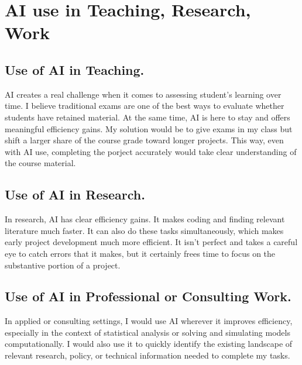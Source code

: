 \documentclass[11pt]{article}
\begin{document}
\section{\large AI use in Teaching, Research, Work}

\subsection{Use of AI in Teaching.}

\par AI creates a real challenge when it comes to assessing student's learning over time. I believe traditional exams are one of the best ways to evaluate whether students have retained material. At the same time, AI is here to stay and offers meaningful efficiency gains. My solution would be to give exams in my class but shift a larger share of the course grade toward longer projects. This way, even with AI use, completing the porject accurately would take clear understanding of the course material.


\subsection{Use of AI in Research.}

\par In research, AI has clear efficiency gains. It makes coding and finding relevant literature much faster. It can also do these tasks simultaneously, which makes early project development much more efficient. It isn't perfect and takes a careful eye to catch errors that it makes, but it certainly frees time to focus on the substantive portion of a project.


\subsection{Use of AI in Professional or Consulting Work.}

\par In applied or consulting settings, I would use AI wherever it improves efficiency, especially in the context of statistical analysis or solving and simulating models computationally. I would also use it to quickly identify the existing landscape of relevant research, policy, or technical information needed to complete my tasks.
\end{document}
